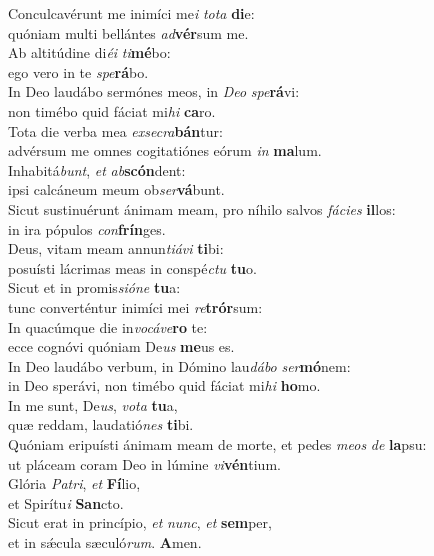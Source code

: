 \evenverse Conculcavérunt me inimíci me\textit{i} \textit{to}\textit{ta} \textbf{di}e:~\*\\
\evenverse quóniam multi bellántes \textit{ad}\textbf{vér}sum me.\\
\oddverse Ab altitúdine di\textit{é}\textit{i} \textit{ti}\textbf{mé}bo:~\*\\
\oddverse ego vero in te \textit{spe}\textbf{rá}bo.\\
\evenverse In Deo laudábo sermónes meos, in \textit{De}\textit{o} \textit{spe}\textbf{rá}vi:~\*\\
\evenverse non timébo quid fáciat mi\textit{hi} \textbf{ca}ro.\\
\oddverse Tota die verba mea \textit{ex}\textit{se}\textit{cra}\textbf{bán}tur:~\*\\
\oddverse advérsum me omnes cogitatiónes eórum \textit{in} \textbf{ma}lum.\\
\evenverse Inhabitá\textit{bunt}, \textit{et} \textit{ab}\textbf{scón}dent:~\*\\
\evenverse ipsi calcáneum meum ob\textit{ser}\textbf{vá}bunt.\\
\oddverse Sicut sustinuérunt ánimam meam, pro níhilo salvos \textit{fá}\textit{ci}\textit{es} \textbf{il}los:~\*\\
\oddverse in ira pópulos \textit{con}\textbf{frín}ges.\\
\evenverse Deus, vitam meam annun\textit{ti}\textit{á}\textit{vi} \textbf{ti}bi:~\*\\
\evenverse posuísti lácrimas meas in conspé\textit{ctu} \textbf{tu}o.\\
\oddverse Sicut et in promis\textit{si}\textit{ó}\textit{ne} \textbf{tu}a:~\*\\
\oddverse tunc converténtur inimíci mei \textit{re}\textbf{trór}sum:\\
\evenverse In quacúmque die in\textit{vo}\textit{cá}\textit{ve}\textbf{ro} te:~\*\\
\evenverse ecce cognóvi quóniam De\textit{us} \textbf{me}us es.\\
\oddverse In Deo laudábo verbum, in Dómino lau\textit{dá}\textit{bo} \textit{ser}\textbf{mó}nem:~\*\\
\oddverse in Deo sperávi, non timébo quid fáciat mi\textit{hi} \textbf{ho}mo.\\
\evenverse In me sunt, De\textit{us}, \textit{vo}\textit{ta} \textbf{tu}a,~\*\\
\evenverse quæ reddam, laudatió\textit{nes} \textbf{ti}bi.\\
\oddverse Quóniam eripuísti ánimam meam de morte, et pedes \textit{me}\textit{os} \textit{de} \textbf{la}psu:~\*\\
\oddverse ut pláceam coram Deo in lúmine \textit{vi}\textbf{vén}tium.\\
\evenverse Glória \textit{Pa}\textit{tri}, \textit{et} \textbf{Fí}lio,~\*\\
\evenverse et Spirítu\textit{i} \textbf{San}cto.\\
\oddverse Sicut erat in princípio, \textit{et} \textit{nunc}, \textit{et} \textbf{sem}per,~\*\\
\oddverse et in sǽcula sæculó\textit{rum}. \textbf{A}men.\\

